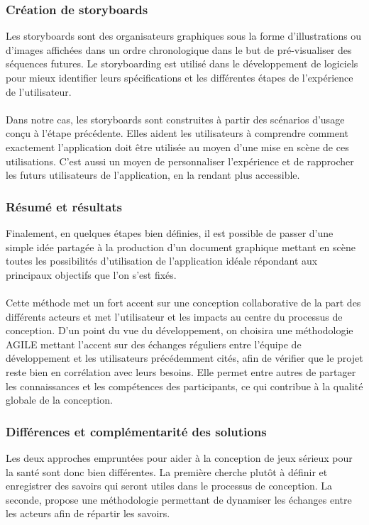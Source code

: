 	
	\subsubsection*{Création de storyboards}
Les storyboards sont des organisateurs graphiques sous la forme d'illustrations ou d'images affichées dans un ordre chronologique dans le but de pré-visualiser des séquences futures. Le storyboarding est utilisé dans le développement de logiciels pour mieux identifier leurs spécifications et les différentes étapes de l'expérience de l'utilisateur.
\paragraph{}
Dans notre cas, les storyboards sont construites à partir des scénarios d'usage conçu à l'étape précédente. Elles aident les utilisateurs à comprendre comment exactement l'application doit être utilisée au moyen d'une mise en scène de ces utilisations. C'est aussi un moyen de personnaliser l'expérience et de rapprocher les futurs utilisateurs de l'application, en la rendant plus accessible.
	
	\subsubsection*{Résumé et résultats}	 
Finalement, en quelques étapes bien définies, il est possible de passer d'une simple idée partagée à la production d'un document graphique mettant en scène toutes les possibilités d'utilisation de l'application idéale répondant aux principaux objectifs que l'on s'est fixés.

\paragraph{} Cette méthode met un fort accent sur une conception collaborative de la part des différents acteurs et met l'utilisateur et les impacts au centre du processus de conception. D'un point du vue du développement, on choisira une méthodologie AGILE mettant l'accent sur des échanges réguliers entre l'équipe de développement et les utilisateurs précédemment cités, afin de vérifier que le projet reste bien en corrélation avec leurs besoins. Elle permet entre autres de partager les connaissances et les compétences des participants, ce qui contribue à la qualité globale de la conception.

	\subsubsection{Différences et complémentarité des solutions}
Les deux approches empruntées pour aider à la conception de jeux sérieux pour la santé sont donc bien différentes. La première cherche plutôt à définir et enregistrer des savoirs qui seront utiles dans le processus de conception. La seconde, propose une méthodologie permettant de dynamiser les échanges entre les acteurs afin de répartir les savoirs.

